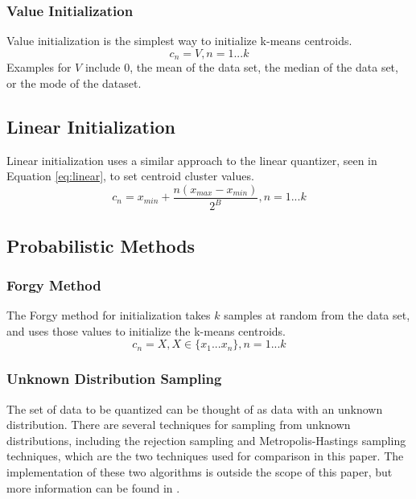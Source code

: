 \documentclass[journal]{IEEEtran}
\begin{document}
\subsubsection{Value Initialization}
Value initialization is the simplest way to initialize k-means centroids.
\begin{equation}
    c_n = V, n = 1...k
\end{equation}
Examples for $V$ include $0$, the mean of the data set, the median of the data set, or the mode of the dataset.

\subsection{Linear Initialization}
Linear initialization uses a similar approach to the linear quantizer, seen in Equation \ref{eq:linear}, to set centroid cluster values.
\begin{equation}
    c_n = x_{min} + \frac{n(x_{max} - x_{min})}{2^B}, n = 1...k 
\end{equation}

\subsection{Probabilistic Methods}
\subsubsection{Forgy Method}
The Forgy method for initialization takes $k$ samples at random from the data set, and uses those values to initialize the k-means centroids.
\begin{equation}
   c_n = X, X \in \{x_1...x_n\}, n = 1...k
\end{equation}

\subsubsection{Unknown Distribution Sampling}
The set of data to be quantized can be thought of as data with an unknown distribution. There are several techniques for sampling from unknown
distributions, including the rejection sampling and Metropolis-Hastings sampling techniques, which are the two techniques used for comparison in this
paper. The implementation of these two algorithms is outside the scope of this paper, but more information can be found in \cite{BayesianBook}.
\end{document}
